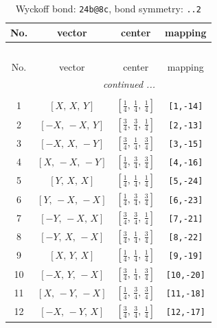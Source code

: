 \documentclass[fleqn,8pt]{jsarticle}
\begin{document}
\renewcommand{\arraystretch}{1.2}
\begin{longtable}{cccc}
\caption{Wyckoff bond: {\tt 24b@8c}, bond symmetry: {\tt ..2}}
 \\
 \hline \hline
No. & vector & center & mapping \\ \hline \endfirsthead

\multicolumn{3}{l}{\tablename\ \thetable{}} \\
 \hline \hline
No. & vector & center & mapping \\ \hline \endhead

 \hline \hline
\multicolumn{3}{r}{\footnotesize\it continued ...} \\ \endfoot

 \hline \hline
\multicolumn{3}{r}{} \\ \endlastfoot

1 & $\left[ X,\, X,\, Y \right]$ & $\left[ \frac{1}{4},\, \frac{1}{4},\, \frac{1}{4} \right]$ & {\tt [1,-14]} \\ \hline
2 & $\left[ - X,\, - X,\, Y \right]$ & $\left[ \frac{3}{4},\, \frac{3}{4},\, \frac{1}{4} \right]$ & {\tt [2,-13]} \\ \hline
3 & $\left[ - X,\, X,\, - Y \right]$ & $\left[ \frac{3}{4},\, \frac{1}{4},\, \frac{3}{4} \right]$ & {\tt [3,-15]} \\ \hline
4 & $\left[ X,\, - X,\, - Y \right]$ & $\left[ \frac{1}{4},\, \frac{3}{4},\, \frac{3}{4} \right]$ & {\tt [4,-16]} \\ \hline
5 & $\left[ Y,\, X,\, X \right]$ & $\left[ \frac{1}{4},\, \frac{1}{4},\, \frac{1}{4} \right]$ & {\tt [5,-24]} \\ \hline
6 & $\left[ Y,\, - X,\, - X \right]$ & $\left[ \frac{1}{4},\, \frac{3}{4},\, \frac{3}{4} \right]$ & {\tt [6,-23]} \\ \hline
7 & $\left[ - Y,\, - X,\, X \right]$ & $\left[ \frac{3}{4},\, \frac{3}{4},\, \frac{1}{4} \right]$ & {\tt [7,-21]} \\ \hline
8 & $\left[ - Y,\, X,\, - X \right]$ & $\left[ \frac{3}{4},\, \frac{1}{4},\, \frac{3}{4} \right]$ & {\tt [8,-22]} \\ \hline
9 & $\left[ X,\, Y,\, X \right]$ & $\left[ \frac{1}{4},\, \frac{1}{4},\, \frac{1}{4} \right]$ & {\tt [9,-19]} \\ \hline
10 & $\left[ - X,\, Y,\, - X \right]$ & $\left[ \frac{3}{4},\, \frac{1}{4},\, \frac{3}{4} \right]$ & {\tt [10,-20]} \\ \hline
11 & $\left[ X,\, - Y,\, - X \right]$ & $\left[ \frac{1}{4},\, \frac{3}{4},\, \frac{3}{4} \right]$ & {\tt [11,-18]} \\ \hline
12 & $\left[ - X,\, - Y,\, X \right]$ & $\left[ \frac{3}{4},\, \frac{3}{4},\, \frac{1}{4} \right]$ & {\tt [12,-17]} \\
\end{longtable}
\end{document}
